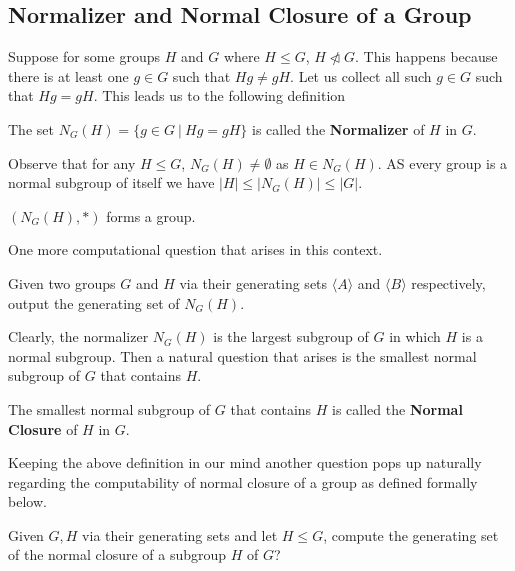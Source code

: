 \subsection{Normalizer and Normal Closure of a Group}
Suppose for some groups $H$ and $G$ where $H\leq G$, $H\ntriangleleft G$. This happens because there is at least one $g\in G$ such that $Hg\neq gH$. 
Let us collect all such $g\in G$ such that $Hg = gH$. This leads us to the following definition 
\begin{definition}\label{normalizer}
	The set $N_G(H) = \{g\in G~|~Hg = gH\}$ is called the {\bf Normalizer} of $H$ in $G$.
\end{definition}
Observe that for any $H\leq G$, $N_G(H) \neq \emptyset$ as $H\in N_G(H)$. AS every group is a normal subgroup of itself we have $|H|\leq |N_G(H)| \leq |G|$.

\begin{observation}
 $(N_G(H),*)$ forms a group. 
\end{observation}
 
 
 One more computational question that arises in this context.
\begin{problem}\label{3}
	Given two groups $G$ and $H$ via their generating sets $\langle A\rangle$ and $\langle B\rangle$ respectively, output the generating set of $N_G(H)$.
\end{problem}
Clearly, the normalizer $N_G(H)$ is the largest subgroup of $G$ in which $H$ is a normal subgroup. Then a natural question that arises is the smallest normal subgroup of $G$ that contains $H$. 
\begin{definition}
The smallest normal subgroup of $G$ that contains $H$ is called the {\bf Normal Closure} of $H$ in $G$.
\end{definition}
Keeping the above definition in our mind another question pops up naturally regarding the computability of normal closure of a group as defined formally below.
\begin{exercise}
	Given $G,H$ via their generating sets and let $H\leq G$, compute the generating set of the normal closure of a subgroup $H$ of $G$? 
\end{exercise}


